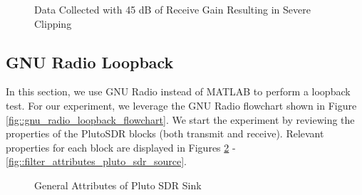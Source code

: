 \documentclass{article}
\begin{document}
\begin{figure}[H]
	\centerline{}
	\caption{Data Collected with 45 dB of Receive Gain Resulting in Severe Clipping}
	\label{fig::matlab_loopback_agc_manual_45db_gain}
\end{figure}

\subsection{GNU Radio Loopback}

In this section, we use GNU Radio instead of MATLAB to perform a loopback test. For our experiment, we leverage the GNU Radio flowchart shown in Figure \ref{fig::gnu_radio_loopback_flowchart}. We start the experiment by reviewing the properties of the PlutoSDR blocks (both transmit and receive). Relevant properties for each block are displayed in Figures \ref{fig::general_attributes_pluto_sdr_sink} - \ref{fig::filter_attributes_pluto_sdr_source}.

\begin{figure}[H]
	\centerline{}
	\caption{General Attributes of Pluto SDR Sink}
	\label{fig::general_attributes_pluto_sdr_sink}
\end{figure}
\end{document}
